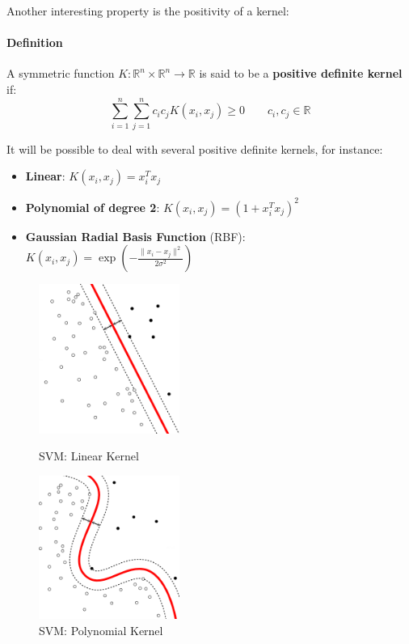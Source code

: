 Another interesting property is the positivity of a kernel:
\paragraph{Definition} 
A symmetric function  $K: \mathbb{R}^n\times\mathbb{R}^n \rightarrow \mathbb{R}$ is said to be a \textbf{positive definite kernel} if:
$$\sum_{i=1}^n \sum_{j=1}^n c_i c_j K(x_i, x_j) \geq 0	\qquad c_i,c_j \in \mathbb{R}$$

It will be possible to deal with several positive definite kernels, for instance:
\begin{itemize}
	\item \textbf{Linear}: $K(x_i,x_j) = x_i^Tx_j$
	\item \textbf{Polynomial of degree 2}: $K(x_i,x_j) = (1 + x_i^Tx_j)^2$
	\item \textbf{Gaussian Radial Basis Function} (RBF): 
	$K(x_i, x_j) = \exp\left(-\frac{\|x_i - x_j\|^2}{2\sigma^2}\right)$
\end{itemize}
\begin{figure}[!h]
	\begin{minipage}[t]{0.5\linewidth}
		\centering
		\includegraphics[width=0.41\textwidth]{img/Linear_Kernel_Machine.png}
		\caption{SVM: Linear Kernel}
		\label{f1}
	\end{minipage}
	\hspace{0.1cm}
	\begin{minipage}[t]{0.5\linewidth} 
		\centering
		\includegraphics[width=0.41\textwidth]{img/Poly_Kernel_Machine.png}
		\caption{SVM: Polynomial Kernel}
		\label{f2}
	\end{minipage}        
\end{figure} 

